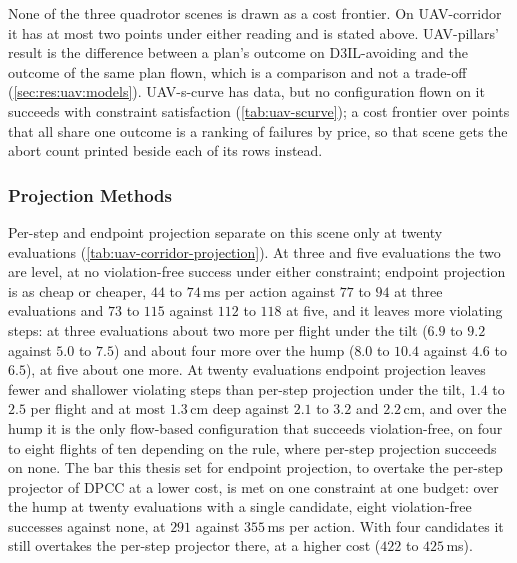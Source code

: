 None of the three quadrotor scenes is drawn as a cost frontier. On UAV-corridor it has at most two
points under either reading and is stated above.
UAV-pillars' result is the difference between a plan's outcome on D3IL-avoiding and the outcome of the
same plan flown, which is a comparison and not a trade-off (\autoref{sec:res:uav:models}). UAV-s-curve
has data, but no configuration flown on it succeeds with constraint satisfaction
(\autoref{tab:uav-scurve}); a cost frontier over points that all share one outcome is a ranking of
failures by price, so that scene gets the abort count printed beside each of its rows instead.

\FloatBarrier
\subsubsection{Projection Methods}\label{sec:res:uav:projection}
Per-step and endpoint projection separate on this scene only at twenty evaluations
(\autoref{tab:uav-corridor-projection}). At three and five evaluations the two are level, at no
violation-free success under either constraint; endpoint projection is as cheap or cheaper, $44$ to
$74$\,ms per action against $77$ to $94$ at three evaluations and $73$ to $115$ against $112$ to $118$ at
five, and it leaves more violating steps: at three evaluations about two more per flight under the tilt
($6.9$ to $9.2$ against $5.0$ to $7.5$) and about four more over the hump ($8.0$ to $10.4$ against $4.6$
to $6.5$), at five about one more. At twenty evaluations endpoint projection leaves fewer and shallower
violating steps than per-step projection under the tilt, $1.4$ to $2.5$ per flight and at most
$1.3$\,cm deep against $2.1$ to $3.2$ and $2.2$\,cm, and
over the hump it is the only flow-based configuration that succeeds violation-free, on four to eight
flights of ten depending on the rule, where per-step projection succeeds on none. The bar this thesis set
for endpoint projection, to overtake the per-step projector of \ac{DPCC} at a lower cost, is met on one
constraint at one budget: over the hump at twenty evaluations with a single candidate, eight
violation-free successes against none, at $291$ against $355$\,ms per action. With four candidates it
still overtakes the per-step projector there, at a higher cost ($422$ to $425$\,ms).

